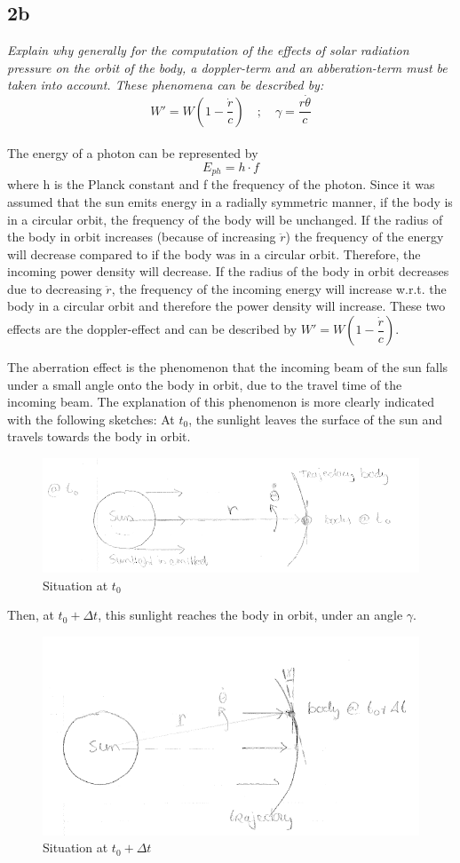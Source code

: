\subsection{2b}
\textit{Explain why generally for the computation of the effects of solar radiation pressure on the orbit of the body, a doppler-term and an abberation-term must be taken into account. These phenomena can be described by:} 
\begin{equation}
    W'=W\left( 1-\dfrac {\dot{r}}{c}\right) \quad ; \quad \gamma =\dfrac {r \dot{\theta} }{c}
\end{equation}
\\
The energy of a photon can be represented by 
\begin{equation}
    E_{ph} = h \cdot f
\end{equation}
where h is the Planck constant and f the frequency of the photon.
Since it was assumed that the sun emits energy in a radially symmetric manner, if the body is in a circular orbit, the frequency of the body will be unchanged.
If the radius of the body in orbit increases (because of increasing $\ddot{r}$) the frequency of the energy will decrease compared to if the body was in a circular orbit. Therefore, the incoming power density will decrease.
If the radius of the body in orbit decreases due to decreasing $\ddot{r}$, the frequency of the incoming energy will increase w.r.t. the body in a circular orbit and therefore the power density will increase.
These two effects are the doppler-effect and can be described by $W'=W\left( 1-\dfrac {\dot{r}}{c}\right)$.

The aberration effect is the phenomenon that the incoming beam of the sun falls under a small angle onto the body in orbit, due to the travel time of the incoming beam. The explanation of this phenomenon is more clearly indicated with the following sketches:
At $t_0$, the sunlight leaves the surface of the sun and travels towards the body in orbit.
\begin{figure}[H]
    \centering
    \includegraphics[width=0.5\columnwidth]{Figures/2b.png}
    \caption{Situation at $t_0$}
    \label{fig:aberration1}
\end{figure}

Then, at $t_0 + \Delta t$, this sunlight reaches the body in orbit, under an angle $\gamma$.
\begin{figure}[H]
    \centering
    \includegraphics[width=0.5\columnwidth]{Figures/2b2.png}
    \caption{Situation at $t_0 + \Delta t$}
    \label{fig:aberration2}
\end{figure}

